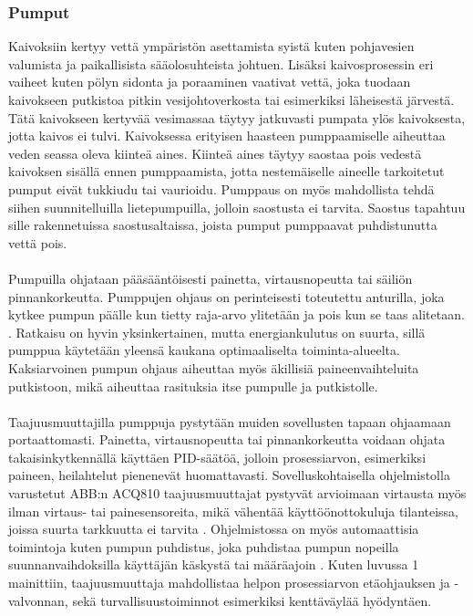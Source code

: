 \documentclass[finnish,12pt,a4paper,pdftex,elec,utf8]{aaltothesis}
\begin{document}
\subsubsection{Pumput}
Kaivoksiin kertyy vettä ympäristön asettamista syistä kuten pohjavesien valumista ja paikallisista sääolosuhteista johtuen. Lisäksi kaivosprosessin eri vaiheet kuten pölyn sidonta ja poraaminen vaativat vettä, joka tuodaan kaivokseen putkistoa pitkin vesijohtoverkosta tai esimerkiksi läheisestä järvestä. Tätä kaivokseen kertyvää vesimassaa täytyy jatkuvasti pumpata ylös kaivoksesta, jotta kaivos ei tulvi. Kaivoksessa erityisen haasteen pumppaamiselle aiheuttaa veden seassa oleva kiinteä aines. Kiinteä aines täytyy saostaa pois vedestä kaivoksen sisällä ennen pumppaamista, jotta nestemäiselle aineelle tarkoitetut pumput eivät tukkiudu tai vaurioidu. Pumppaus on myös mahdollista tehdä siihen suunnitelluilla lietepumpuilla, jolloin saostusta ei tarvita. Saostus tapahtuu sille rakennetuissa saostusaltaissa, joista pumput pumppaavat puhdistunutta vettä pois. \cite[s. 307]{Hakapää}
\\\\
Pumpuilla ohjataan pääsääntöisesti painetta, virtausnopeutta tai säiliön pinnankorkeutta. Pumppujen ohjaus on perinteisesti toteutettu anturilla, joka kytkee pumpun päälle kun tietty raja-arvo ylitetään ja pois kun se taas alitetaan. \cite[s. 315]{Hakapää}. Ratkaisu on hyvin yksinkertainen, mutta energiankulutus on suurta, sillä pumppua käytetään yleensä kaukana optimaaliselta toiminta-alueelta. Kaksiarvoinen pumpun ohjaus aiheuttaa myös äkillisiä paineenvaihteluita putkistoon, mikä aiheuttaa rasituksia itse pumpulle ja putkistolle.
\\\\
Taajuusmuuttajilla pumppuja pystytään muiden sovellusten tapaan ohjaamaan portaattomasti. Painetta, virtausnopeutta tai pinnankorkeutta voidaan ohjata takaisinkytkennällä käyttäen PID-säätöä, jolloin prosessiarvon, esimerkiksi paineen, heilahtelut pienenevät huomattavasti. Sovelluskohtaisella ohjelmistolla varustetut ABB:n ACQ810 taajuusmuuttajat pystyvät arvioimaan virtausta myös ilman virtaus- tai painesensoreita, mikä vähentää käyttöönottokuluja tilanteissa, joissa suurta tarkkuutta ei tarvita \cite{ACQ810}. Ohjelmistossa on myös automaattisia toimintoja kuten pumpun puhdistus, joka puhdistaa pumpun nopeilla suunnanvaihdoksilla käyttäjän käskystä tai määräajoin \cite{ACQ810}. Kuten luvussa 1 mainittiin, taajuusmuuttaja mahdollistaa helpon prosessiarvon etäohjauksen ja -valvonnan, sekä turvallisuustoiminnot esimerkiksi kenttäväylää hyödyntäen.
\end{document}
